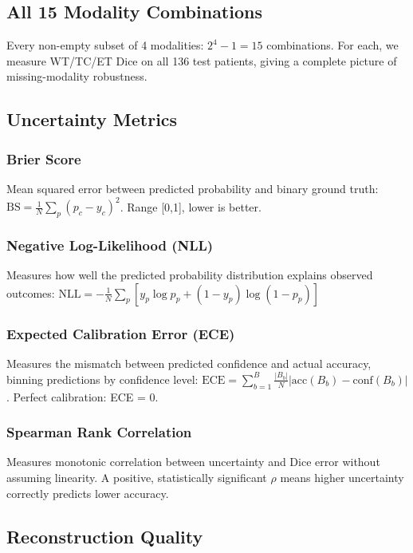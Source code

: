 \documentclass[12pt,a4paper]{article}
\begin{document}
\subsection{All 15 Modality Combinations}

Every non-empty subset of 4 modalities: $2^4 - 1 = 15$ combinations. For each, we measure WT/TC/ET Dice on all 136 test patients, giving a complete picture of missing-modality robustness.

\subsection{Uncertainty Metrics}

\subsubsection{Brier Score}
Mean squared error between predicted probability and binary ground truth:
$\text{BS} = \frac{1}{N}\sum_p(p_c - y_c)^2$. Range [0,1], lower is better.

\subsubsection{Negative Log-Likelihood (NLL)}
Measures how well the predicted probability distribution explains observed outcomes:
$\text{NLL} = -\frac{1}{N}\sum_p[y_p\log p_p + (1-y_p)\log(1-p_p)]$

\subsubsection{Expected Calibration Error (ECE)}
Measures the mismatch between predicted confidence and actual accuracy, binning predictions by confidence level:
$\text{ECE} = \sum_{b=1}^{B}\frac{|B_b|}{N}|\text{acc}(B_b) - \text{conf}(B_b)|$. Perfect calibration: ECE = 0.

\subsubsection{Spearman Rank Correlation}
Measures monotonic correlation between uncertainty and Dice error without assuming linearity. A positive, statistically significant $\rho$ means higher uncertainty correctly predicts lower accuracy.

\subsection{Reconstruction Quality}
\end{document}
